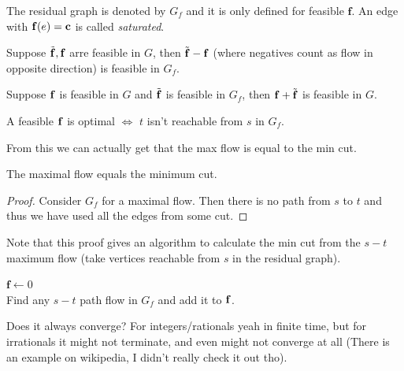 The residual graph is denoted by $G_f$ and it is only defined for feasible $\mathbf{f}$. An edge with $\mathbf{f} (e) = \mathbf{c}$ is called \emph{saturated}. 

\begin{lema}
    Suppose $\Tilde{\mathbf{f}}, \mathbf{f}$ arre feasible in $G$, then $\Tilde{\mathbf{f}} - \mathbf{f}$ (where negatives count as flow in opposite direction) is feasible in $G_f$.
\end{lema}

\obvs

\begin{lema}
    Suppose $\mathbf{f}$ is feasible in $G$ and $\Tilde{\mathbf{f}}$ is feasible in $G_f$, then $\mathbf{f} + \Tilde{\mathbf{f}}$ is feasible in $G$.
\end{lema}

\obvs

\begin{lema}
    A feasible $\mathbf{f}$ is optimal $\iff$ $t$ isn't reachable from $s$ in $G_f$.
\end{lema}

\obvs

From this we can actually get that the max flow is equal to the min cut.

\begin{izrek}[Max Flow = Min Cut]
    The maximal flow equals the minimum cut.
\end{izrek}

\begin{proof}
    Consider $G_f$ for a maximal flow. Then there is no path from $s$ to $t$ and thus we have used all the edges from some cut.
\end{proof}


Note that this proof gives an algorithm to calculate the min cut from the $s-t$ maximum flow (take vertices reachable from $s$ in the residual graph).


\begin{algorithm}
\caption{Ford-Fulkerson Algo}\label{alg:second}
\begin{algorithmic}
\State $\mathbf{f} \gets 0$
\While{}\\
    Find any $s-t$ path flow in $G_f$ and add it to $\mathbf{f}$.
\EndWhile
\end{algorithmic}
\end{algorithm}

Does it always converge? For integers/rationals yeah in finite time, but for irrationals it might not terminate, and even might not converge at all (There is an example on wikipedia, I didn't really check it out tho).

